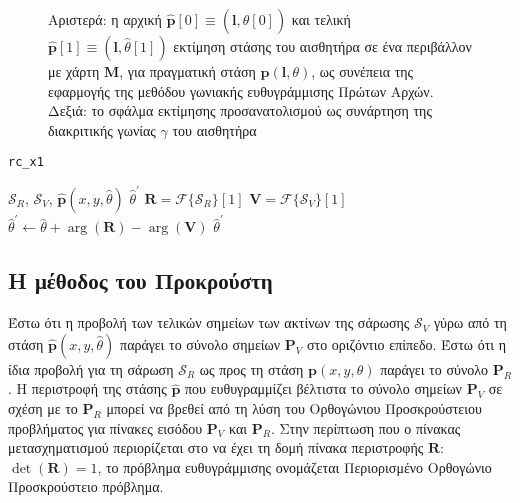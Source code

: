 \begin{figure}[!h]\centering
  \vspace{0.5cm}
  
  \vspace{0.5cm}
  \caption{\small Αριστερά: η αρχική
           $\hat{\bm{p}}[0] \equiv (\bm{l},\hat{\theta}[0])$ και τελική
           $\hat{\bm{p}}[1] \equiv (\bm{l},\hat{\theta}[1])$ εκτίμηση στάσης του
           αισθητήρα σε ένα περιβάλλον με χάρτη $\bm{M}$, για πραγματική στάση
           $\bm{p}(\bm{l},\theta)$, ως συνέπεια της εφαρμογής της μεθόδου
           γωνιακής ευθυγράμμισης Πρώτων Αρχών. Δεξιά: το σφάλμα εκτίμησης
           προσανατολισμού ως συνάρτηση της διακριτικής γωνίας $\gamma$ του
           αισθητήρα}
  \label{fig:02_04_02:rc_x1}
\end{figure}

\begin{algorithm}[!h]
  \caption{\texttt{rc\_x1}}
  \begin{spacing}{1.3}
  \begin{algorithmic}[1]
    \REQUIRE $\mathcal{S}_R$, $\mathcal{S}_V$, $\hat{\bm{p}}(x, y, \hat{\theta})$
    \ENSURE $\hat{\theta}^\prime$
    \STATE $\bm{R} = \mathcal{F}\{\mathcal{S}_R\}[1]$
    \STATE $\bm{V} = \mathcal{F}\{\mathcal{S}_V\}[1]$
    \STATE $\hat{\theta}^\prime \leftarrow \hat{\theta} + \arg(\bm{R}) - \arg(\bm{V})$
    \RETURN $\hat{\theta}^\prime$
  \end{algorithmic}
  \end{spacing}
  \label{alg:algorithm_x1rc}
\end{algorithm}

\subsection{Η μέθοδος του Προκρούστη}
\label{subsection:02_04_02:03}

Έστω ότι η προβολή των τελικών σημείων των ακτίνων της σάρωσης $\mathcal{S}_V$
γύρω από τη στάση $\hat{\bm{p}}(x,y,\hat{\theta})$ παράγει το σύνολο σημείων
$\bm{P}_V$ στο οριζόντιο επίπεδο. Έστω ότι η ίδια προβολή για τη σάρωση
$\mathcal{S}_R$ ως προς τη στάση $\bm{p}(x,y,\theta)$ παράγει το σύνολο
$\bm{P}_R$. Η περιστροφή της στάσης $\hat{\bm{p}}$ που ευθυγραμμίζει βέλτιστα
το σύνολο σημείων $\bm{P}_V$ σε σχέση με το $\bm{P}_R$ μπορεί να βρεθεί από τη
λύση του Ορθογώνιου Προσκρούστειου προβλήματος \cite{Schonemann1966a} για
πίνακες εισόδου $\bm{P}_V$ και $\bm{P}_R$. Στην περίπτωση που ο πίνακας
μετασχηματισμού περιορίζεται στο να έχει τη δομή πίνακα περιστροφής $\bm{R}$:
$\det{(\bm{R})} = 1$, το πρόβλημα ευθυγράμμισης ονομάζεται Περιορισμένο
Ορθογώνιο Προσκρούστειο πρόβλημα.

